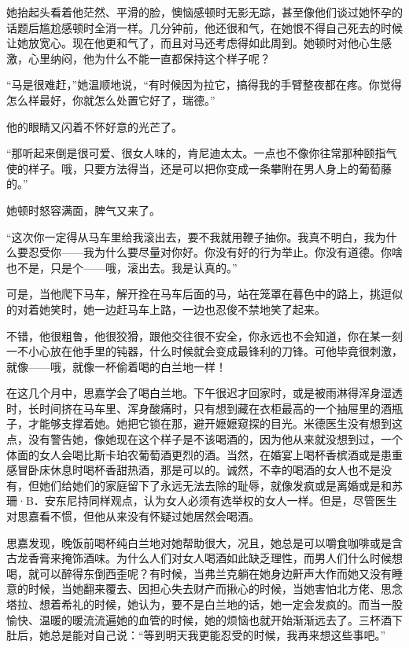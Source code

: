 \par 她抬起头看着他茫然、平滑的脸，懊恼感顿时无影无踪，甚至像他们谈过她怀孕的话题后尴尬感顿时全消一样。几分钟前，他还很和气，在她恨不得自己死去的时候让她放宽心。现在他更和气了，而且对马还考虑得如此周到。她顿时对他心生感激，心里纳闷，他为什么不能一直都保持这个样子呢？
\par “马是很难赶，”她温顺地说，“有时候因为拉它，搞得我的手臂整夜都在疼。你觉得怎么样最好，你就怎么处置它好了，瑞德。”
\par 他的眼睛又闪着不怀好意的光芒了。
\par “那听起来倒是很可爱、很女人味的，肯尼迪太太。一点也不像你往常那种颐指气使的样子。哦，只要方法得当，还是可以把你变成一条攀附在男人身上的葡萄藤的。”
\par 她顿时怒容满面，脾气又来了。
\par “这次你一定得从马车里给我滚出去，要不我就用鞭子抽你。我真不明白，我为什么要忍受你——我为什么要尽量对你好。你没有好的行为举止。你没有道德。你啥也不是，只是个——哦，滚出去。我是认真的。”
\par 可是，当他爬下马车，解开拴在马车后面的马，站在笼罩在暮色中的路上，挑逗似的对着她笑时，她一边赶马车上路，一边也忍俊不禁地笑了起来。
\par 不错，他很粗鲁，他很狡猾，跟他交往很不安全，你永远也不会知道，你在某一刻一不小心放在他手里的钝器，什么时候就会变成最锋利的刀锋。可他毕竟很刺激，就像——哦，就像一杯偷着喝的白兰地一样！
\par 在这几个月中，思嘉学会了喝白兰地。下午很迟才回家时，或是被雨淋得浑身湿透时，长时间挤在马车里、浑身酸痛时，只有想到藏在衣柜最高的一个抽屉里的酒瓶子，才能够支撑着她。她把它锁在那，避开嬷嬷窥探的目光。米德医生没有想到这点，没有警告她，像她现在这个样子是不该喝酒的，因为他从来就没想到过，一个体面的女人会喝比斯卡珀农葡萄酒更烈的酒。当然，在婚宴上喝杯香槟酒或是患重感冒卧床休息时喝杯香甜热酒，那是可以的。诚然，不幸的喝酒的女人也不是没有，但她们给她们的家庭留下了永远无法去除的耻辱，就像发疯或是离婚或是和苏珊·B．安东尼持同样观点，认为女人必须有选举权的女人一样。但是，尽管医生对思嘉看不惯，但他从来没有怀疑过她居然会喝酒。
\par 思嘉发现，晚饭前喝杯纯白兰地对她帮助很大，况且，她总是可以嚼食咖啡或是含古龙香膏来掩饰酒味。为什么人们对女人喝酒如此缺乏理性，而男人们什么时候想喝，就可以醉得东倒西歪呢？有时候，当弗兰克躺在她身边鼾声大作而她又没有睡意的时候，当她翻来覆去、因担心失去财产而揪心的时候，当她害怕北方佬、思念塔拉、想着希礼的时候，她认为，要不是白兰地的话，她一定会发疯的。而当一股愉快、温暖的暖流流遍她的血管的时候，她的烦恼也就开始渐渐远去了。三杯酒下肚后，她总是能对自己说：“等到明天我更能忍受的时候，我再来想这些事吧。”
